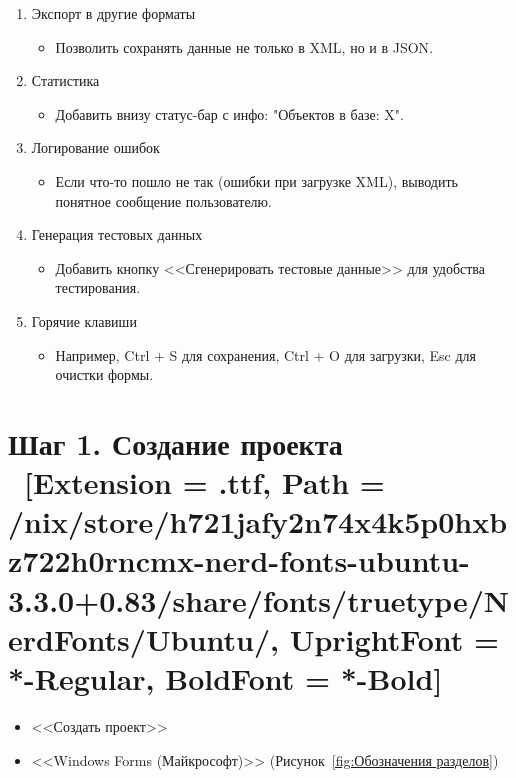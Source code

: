 \documentclass[12pt]{article}
\newcommand{\icon}[1]{\fontspec{UbuntuNerdFont}[Extension = .ttf,
  Path = /nix/store/h721jafy2n74x4k5p0hxbz722h0rncmx-nerd-fonts-ubuntu-3.3.0+0.83/share/fonts/truetype/NerdFonts/Ubuntu/,
  UprightFont = *-Regular,
BoldFont = *-Bold] #1}
\newcommand{\iicon}[1]{{\icon{#1}}}
\renewcommand{\texttt}[1]{{\small\ttfamily #1}}
\numberwithin{listing}{section}
\numberwithin{figure}{section}
\begin{document}
\begin{center}
\begin{minipage}{0.8\linewidth}
\begin{enumerate}[noitemsep,topsep=0pt, left=0pt]
			\item[\iicon{}] Экспорт в другие форматы
			      \begin{itemize}
				      \item Позволить сохранять данные не только в \texttt{XML}, но и в \texttt{JSON}.
			      \end{itemize}
			\item[\iicon{}] Статистика
			      \begin{itemize}
				      \item Добавить внизу статус-бар с инфо: "Объектов в базе: X".
			      \end{itemize}
			\item[\iicon{}] Логирование ошибок
			      \begin{itemize}
				      \item Если что-то пошло не так (ошибки при загрузке \texttt{XML}), выводить понятное сообщение пользователю.
			      \end{itemize}
			\item[\iicon{󰙨}] Генерация тестовых данных
			      \begin{itemize}
				      \item Добавить кнопку <<Сгенерировать тестовые данные>> для удобства тестирования.
			      \end{itemize}
			\item[\iicon{}] Горячие клавиши
			      \begin{itemize}
				      \item Например, \texttt{Ctrl + S} для сохранения, \texttt{Ctrl + O} для загрузки, \texttt{Esc} для очистки формы.
			      \end{itemize}
		\end{enumerate}
	\end{minipage}
\end{center}

\newpage

\section{Шаг 1. Создание проекта \ \texorpdfstring{{\small{\iicon{󰙴}}}}{}}
\begin{itemize}
	\item <<Создать проект>>
	\item <<\texttt{Windows Forms} (Майкрософт)>> (Рисунок~\ref{fig:Обозначения разделов})
\end{itemize}
\end{document}
